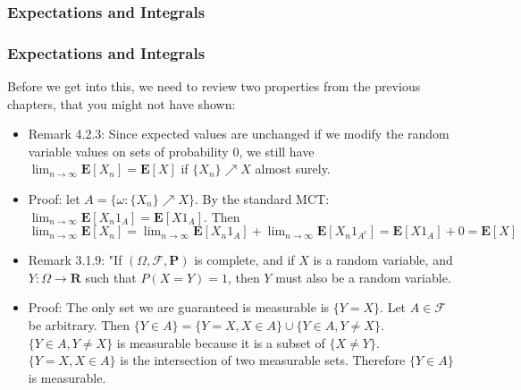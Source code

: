 \documentclass[handout]{beamer}
\newcommand{\BP}{\mathbf{P}}
\newcommand{\BE}{\mathbf{E}}
\begin{document}
\subsubsection{Expectations and Integrals }

\frame
{
  \frametitle{Expectations and Integrals}

Before we get into this, we need to review two properties from the previous chapters, that you might not have shown:

\begin{itemize}

\item<1-> Remark 4.2.3: Since expected values are unchanged if we modify the random variable values on sets of probability $0$, we still have $\lim_{n \to \infty}\BE[X_n] = \BE[X]$ if $\{X_n\} \nearrow X$ almost surely.

\item<2-> Proof: let $A = \{ \omega : \{X_n\} \nearrow X\}$. By the standard MCT: $\lim_{n \to \infty}\BE[X_n1_A] = \BE[X1_A]$. Then $\lim_{n \to \infty}\BE[X_n] = \lim_{n \to \infty}\BE[X_n1_{A}] + \lim_{n \to \infty}\BE[X_n1_{A^c}] = \BE[X1_A] + 0 = \BE[X]$

\item<3-> Remark 3.1.9: "If $(\Omega, \mathcal{F}, \BP)$ is complete, and if $X$ is a random variable, and $Y : \Omega \to \mathbf{R}$ such that $P(X = Y) = 1$, then $Y$ must also be a random variable.

\item<4-> Proof: The only set we are guaranteed is measurable is $\{Y = X\}$. Let $A \in \mathcal{F}$ be arbitrary. Then $\{Y \in A\} = \{Y = X , X \in A\} \cup \{Y \in A, Y \neq X\}$. $\{Y \in A, Y \neq X\}$ is measurable because it is a subset of $\{X \neq Y\}$. $\{Y = X , X \in A\}$ is the intersection of two measurable sets. Therefore $\{Y \in A\}$ is measurable.


\end{itemize}
}
\end{document}
